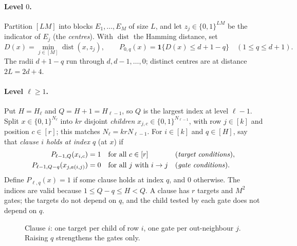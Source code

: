 \documentclass[11pt]{article}
\theoremstyle{definition}
\theoremstyle{remark}
\begin{document}
\paragraph{Level $0$.}
Partition $[LM]$ into blocks $E_1,\ldots,E_M$ of size $L$, and let
$z_j\in\{0,1\}^{LM}$ be the indicator of $E_j$ (the \emph{centres}). With
$\operatorname{dist}$ the Hamming distance, set
\[
 D(x)=\min_{j\in[M]}\operatorname{dist}(x,z_j),\qquad
 P_{0,q}(x)=\mathbf1\{D(x)\le d+1-q\}\quad(1\le q\le d+1).
\]
The radii $d+1-q$ run through $d,d-1,\ldots,0$; distinct centres are at
distance $2L=2d+4$.

\paragraph{Level $\ell\ge1$.}
Put $H=H_\ell$ and $Q=H+1=H_{\ell-1}$, so $Q$ is the largest index at level
$\ell-1$. Split $x\in\{0,1\}^{N_\ell}$ into $kr$ disjoint \emph{children}
$x_{j,c}\in\{0,1\}^{N_{\ell-1}}$, with row $j\in[k]$ and position $c\in[r]$;
this matches $N_\ell=krN_{\ell-1}$. For $i\in[k]$ and $q\in[H]$, say that
\emph{clause $i$ holds at index $q$} (at $x$) if
\begin{equation}\label{eq:predicate-definition}
 \begin{aligned}
 P_{\ell-1,Q}(x_{i,c})&=1 &&\text{for all }c\in[r]
   &&\text{(\emph{target conditions})},\\
 P_{\ell-1,Q-q}(x_{j,a(i,j)})&=0 &&\text{for all $j$ with }i\to j
   &&\text{(\emph{gate conditions})}.
 \end{aligned}
\end{equation}
Define $P_{\ell,q}(x)=1$ if some clause holds at index $q$, and $0$
otherwise. The indices are valid because $1\le Q-q\le H<Q$. A clause has $r$
targets and $M^2$ gates; the targets do not depend on $q$, and the child
tested by each gate does not depend on $q$.

\begin{figure}[htbp]
\centering
{}
\caption{Clause $i$: one target per child of row $i$, one gate per
out-neighbour $j$. Raising $q$ strengthens the gates only.}
\label{fig:clause}
\end{figure}
\end{document}
